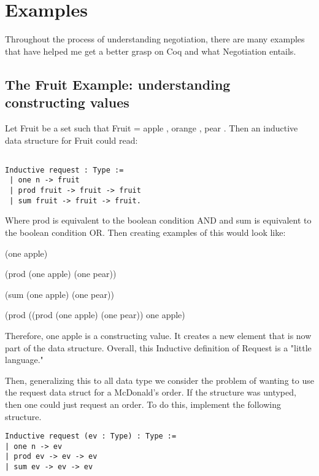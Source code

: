 \documentclass[10pt]{article}
\begin{document}
\section {Examples}

Throughout the process of understanding negotiation, there are many examples that have helped me get a better grasp on Coq and what Negotiation entails. 

\subsection {The Fruit Example: understanding constructing values}

Let Fruit be a set such that Fruit = { apple , orange , pear }. Then an inductive data structure for Fruit could read:  

\begin{verbatim}

Inductive request : Type := 
 | one n -> fruit
 | prod fruit -> fruit -> fruit
 | sum fruit -> fruit -> fruit.
\end{verbatim}

Where prod is equivalent to the boolean condition AND and sum is equivalent to the boolean condition OR. Then creating examples of this would look like: 


(one apple)

(prod (one apple) (one pear))

(sum (one apple) (one pear))

(prod ((prod (one apple) (one pear)) one apple)


Therefore, one apple is a constructing value. It creates a new element that is now part of the data structure. Overall, this Inductive definition of Request is a "little language."

Then, generalizing this to all data type we consider the problem of wanting to use the request data struct for a McDonald's order. If the structure was untyped, then one could just request an order. To do this, implement the following structure. 

\begin{verbatim}
Inductive request (ev : Type) : Type :=
| one n -> ev
| prod ev -> ev -> ev
| sum ev -> ev -> ev

\end{verbatim}
\end{document}
